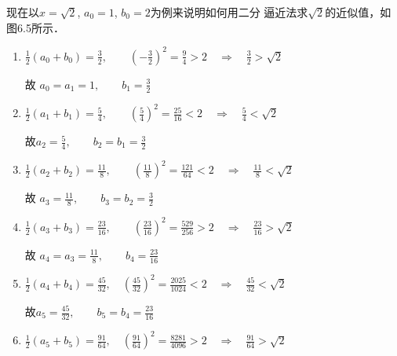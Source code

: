 现在以$x=\sqrt{2}$, $a_0=1$, $b_0=2$为例来说明如何用二分
逼近法求$\sqrt{2}$的近似值，如图6.5所示．
\begin{figure}[htp]
    \centering
{}
    \caption{}
\end{figure}

\begin{enumerate}
    \item  $\frac{1}{2}\left(a_{0}+b_{0}\right)=\frac{3}{2},\qquad \left(-\frac{3}{2}\right)^{2}=\frac{9}{4}>2 \quad\Rightarrow\quad\frac{3}{2}>\sqrt{2}$
    
    故 $a_{0}=a_{1}=1,\qquad   b_{1}=\frac{3}{2}$

    \item   $\frac{1}{2}\left(a_{1}+b_{1}\right)=\frac{5}{4},\qquad \left(\frac{5}{4}\right)^{2}=\frac{25}{16}<2 \quad\Rightarrow\quad \frac{5}{4}<\sqrt{2}$
    
    故$a_{2}=\frac{5}{4}, \qquad  b_{2}=b_{1}=\frac{3}{2}$

    \item  $\frac{1}{2}\left(a_{2}+b_{2}\right)=\frac{11}{8},\qquad \left(\frac{11}{8}\right)^{2}=\frac{121}{64}<2 \quad\Rightarrow\quad \frac{11}{8}<\sqrt{2}$
    
    故 $a_{3}=\frac{11}{8},\qquad  b_{3}=b_{2}=\frac{3}{2}$

    \item   $\frac{1}{2}\left(a_{3}+b_{3}\right)=\frac{23}{16},\qquad \left(\frac{23}{16}\right)^{2}=\frac{529}{256}>2 \quad\Rightarrow\quad \frac{23}{16}>\sqrt{2}$
    
    故 $a_{4}=a_{3}=\frac{11}{8},\qquad  b_{4}=\frac{23}{16}$

    \item  $\frac{1}{2}\left(a_{4}+b_{4}\right)=\frac{45}{32},\quad \left(\frac{45}{32}\right)^{2}=\frac{2025}{1024}<2 \quad\Rightarrow\quad \frac{45}{32}<\sqrt{2}$
    
     故$a_{5}=\frac{45}{32}, \qquad b_{5}=b_{4}=\frac{23}{16}
    $
    
    \item  $\frac{1}{2}\left(a_{5}+b_{5}\right)=\frac{91}{64},\quad \left(\frac{91}{64}\right)^{2}=\frac{8281}{4096}>2 \quad\Rightarrow\quad \frac{91}{64}>\sqrt{2}$
    

\end{enumerate}
